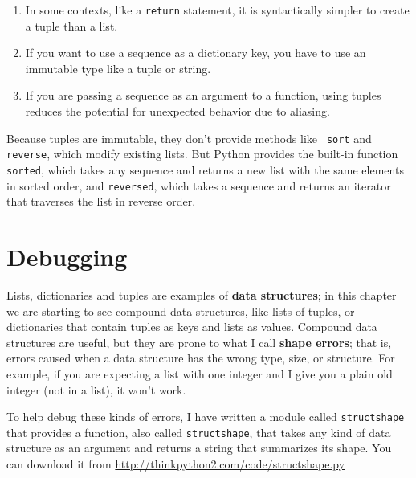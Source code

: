 \documentclass[10pt]{book}
\begin{document}
\begin{enumerate}

\item In some contexts, like a {\tt return} statement, it is
syntactically simpler to create a tuple than a list.

\item If you want to use a sequence as a dictionary key, you
have to use an immutable type like a tuple or string.

\item If you are passing a sequence as an argument to a function,
using tuples reduces the potential for unexpected behavior
due to aliasing.

\end{enumerate}

Because tuples are immutable, they don't provide methods like {\tt
  sort} and {\tt reverse}, which modify existing lists.  But Python
provides the built-in function {\tt sorted}, which takes any sequence
and returns a new list with the same elements in sorted order, and
{\tt reversed}, which takes a sequence and returns an iterator that
traverses the list in reverse order.
 


\section{Debugging}

Lists, dictionaries and tuples are examples of {\bf data
  structures}; in this chapter we are starting to see compound data
structures, like lists of tuples, or dictionaries that contain tuples
as keys and lists as values.  Compound data structures are useful, but
they are prone to what I call {\bf shape errors}; that is, errors
caused when a data structure has the wrong type, size, or structure.
For example, if you are expecting a list with one integer and I
give you a plain old integer (not in a list), it won't work.

To help debug these kinds of errors, I have written a module
called {\tt structshape} that provides a function, also called
{\tt structshape}, that takes any kind of data structure as
an argument and returns a string that summarizes its shape.
You can download it from \url{http://thinkpython2.com/code/structshape.py}
\end{document}
